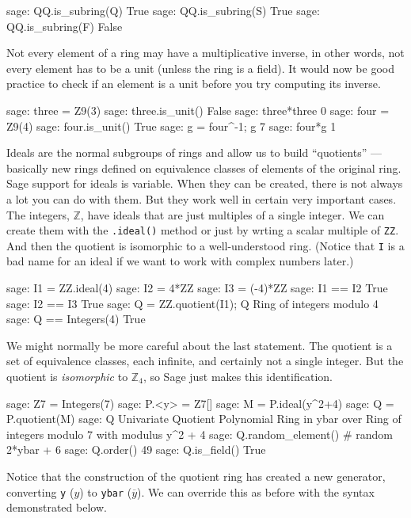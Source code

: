 %
\begin{sageexample}
sage: QQ.is_subring(Q)
True
sage: QQ.is_subring(S)
True
sage: QQ.is_subring(F)
False
\end{sageexample}
%
Not every element of a ring may have a multiplicative inverse, in other words, not every element has to be a unit (unless the ring is a field).  It would now be good practice to check if an element is a unit before you try computing its inverse.
%
\begin{sageexample}
sage: three = Z9(3)
sage: three.is_unit()
False
sage: three*three
0
sage: four = Z9(4)
sage: four.is_unit()
True
sage: g = four^-1; g
7
sage: four*g
1
\end{sageexample}
%
%
Ideals are the normal subgroups of rings and allow us to build ``quotients'' --- basically new rings defined on equivalence classes of elements of the original ring.  Sage support for ideals is variable.  When they can be created, there is not always a lot you can do with them.  But they work well in certain very important cases.
%
The integers, ${\mathbb Z}$, have ideals that are just multiples of a single integer.  We can create them with the \verb?.ideal()? method or just by wrting a scalar multiple of \verb?ZZ?.  And then the quotient is isomorphic to a well-understood ring.  (Notice that \verb?I? is a bad name for an ideal if we want to work with complex numbers later.)
%
\begin{sageexample}
sage: I1 = ZZ.ideal(4)
sage: I2 = 4*ZZ
sage: I3 = (-4)*ZZ
sage: I1 == I2
True
sage: I2 == I3
True
sage: Q = ZZ.quotient(I1); Q
Ring of integers modulo 4
sage: Q == Integers(4)
True
\end{sageexample}
%
We might normally be more careful about the last statement.  The quotient is a set of equivalence classes, each infinite, and certainly not a single integer.  But the quotient is \emph{isomorphic} to ${\mathbb Z}_4$, so Sage just makes this identification.\par
%
\begin{sageexample}
sage: Z7 = Integers(7)
sage: P.<y> = Z7[]
sage: M = P.ideal(y^2+4)
sage: Q = P.quotient(M)
sage: Q
Univariate Quotient Polynomial Ring in ybar over
Ring of integers modulo 7 with modulus y^2 + 4
sage: Q.random_element() # random
2*ybar + 6
sage: Q.order()
49
sage: Q.is_field()
True
\end{sageexample}
%
Notice that the construction of the quotient ring has created a new generator, converting \verb?y? ($y$) to \verb?ybar? ($\overline{y}$).  We can override this as before with the syntax demonstrated below.
